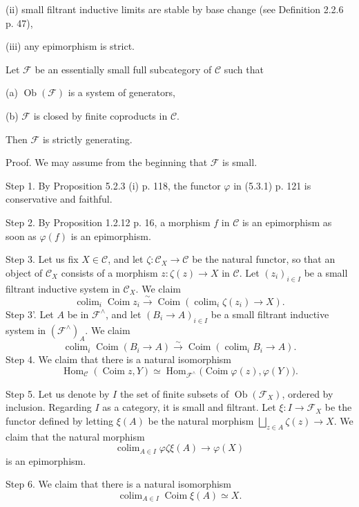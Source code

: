 \documentclass[12pt]{article}
\theoremstyle{remark}
\newcommand{\n}{\noindent}
\newcommand{\C}{\mathcal C}
\newcommand{\F}{\mathcal F}
\newcommand{\p}{\varphi}
\DeclareMathOperator*{\coli}{colim}
\DeclareMathOperator{\Coim}{Coim}
\DeclareMathOperator{\Hom}{Hom}
\DeclareMathOperator{\Ob}{Ob}
\begin{document}
\n (ii) small filtrant inductive limits are stable by base change (see Definition 2.2.6 p. 47), 

\n (iii) any epimorphism is strict.

\n Let $\F$ be an essentially small full subcategory of $\C$ such that 

\n (a) $\Ob(\F)$ is a system of generators,

\n (b) $\F$ is closed by finite coproducts in $\C$. 

\n Then $\F$ is strictly generating.

\centerline *

\n Proof. We may assume from the beginning that $\F$ is small.

\n Step 1. By Proposition 5.2.3 (i) p. 118, the functor $\p$ in (5.3.1) p. 121 is conservative and faithful.

\n Step 2. By Proposition 1.2.12 p. 16, a morphism $f$ in $\C$ is an epimorphism as soon as $\p(f)$ is an epimorphism.

\n Step 3. Let us fix $X\in\C$, and let $\zeta:\C_X\to\C$ be the natural functor, so that an object of $\C_X$ consists of a morphism $z:\zeta(z)\to X$ in $\C$. Let $(z_i)_{i\in I}$ be a small filtrant inductive system in $\C_X$. We claim 
$$
\coli_i\Coim z_i\xrightarrow{\sim}
\Coim\left(\coli_i\zeta(z_i)\to X\right).
$$
\n Step 3'. Let $A$ be in $\F^\wedge$, and let $(B_i\to A)_{i\in I}$ be a small filtrant inductive system in $(\F^\wedge)_A$. We claim 
$$
\coli_i\Coim(B_i\to A)\xrightarrow{\sim}
\Coim\left(\coli_iB_i\to A\right).
$$
Step 4. We claim that there is a natural isomorphism 
$$\Hom_\C(\Coim z,Y)\simeq\Hom_{\F^\wedge}\Big(\Coim\p(z),\p(Y)\Big).
$$ 

\n Step 5. Let us denote by $I$ the set of finite subsets of $\Ob(\F_X)$, ordered by inclusion. Regarding $I$ as a category, it is small and filtrant. Let $\xi:I\to\F_X$ be the functor defined by letting $\xi(A)$ be the natural morphism $\bigsqcup_{z\in A}\zeta(z)\to X$. We claim that the natural morphism 
$$
\coli_{A\in I}\p\zeta\xi(A)\to\p(X) 
$$ 
is an epimorphism.

\n Step 6. We claim that there is a natural isomorphism 
$$
\coli_{A\in I}\Coim\xi(A)\simeq X. 
$$
\end{document}
